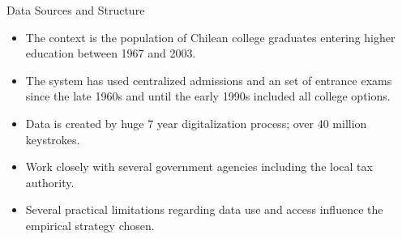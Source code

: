 \documentclass[table,10pt]{beamer}
\begin{document}
\begin{frame}{Data Sources and Structure} %
\centering

\begin{itemize}
  \item<1> The context is the population of Chilean college graduates entering higher education between 1967 and 2003.
  \medskip

  \item<2> The system has used centralized admissions and an set of entrance exams since the late 1960s and until the early 1990s included all college options.
    \medskip

  \item<3> Data is created by huge 7 year digitalization process; over 40 million keystrokes.
    \medskip

  \item<4> Work closely with several government agencies including the local tax authority. %
      \medskip

   \item<5> Several practical limitations regarding data use and access influence the empirical strategy chosen.
    \medskip

\end{itemize}


\end{frame}
\end{document}
